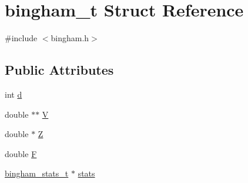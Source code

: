 \hypertarget{structbingham__t}{
\section{bingham\_\-t Struct Reference}
\label{structbingham__t}
}


{\ttfamily \#include $<$bingham.h$>$}

\subsection*{Public Attributes}
\begin{DoxyCompactItemize}
\item 
int \hyperlink{structbingham__t_ab6512093b725c54391b002850d79af5e}{d}
\item 
double $\ast$$\ast$ \hyperlink{structbingham__t_aefd8cb6f68e12a9ea8ef39793484d78a}{V}
\item 
double $\ast$ \hyperlink{structbingham__t_a928a824fae21520964eb3fe48e7f4562}{Z}
\item 
double \hyperlink{structbingham__t_a61db9d1ae00e33e4d79d62c10a1d5ec6}{F}
\item 
\hyperlink{structbingham__stats__t}{bingham\_\-stats\_\-t} $\ast$ \hyperlink{structbingham__t_a4da270f685dce0e8f2aab03273547f99}{stats}
\end{DoxyCompactItemize}


